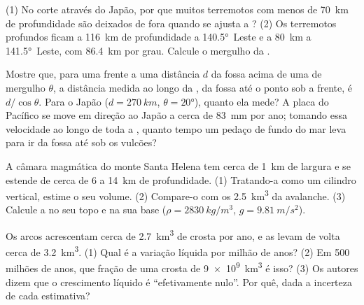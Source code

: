 \begin{exercise}[$\star\star$]\label{exo:g12:subduction-magmatism:11}
(1) No corte através do Japão, por que muitos terremotos com menos de
\qty{70}{km} de profundidade são deixados de fora quando se ajusta a ?
(2) Os terremotos profundos ficam a \qty{116}{km} de profundidade a
\ang{140.5}~Leste e a \qty{80}{km} a \ang{141.5}~Leste, com \qty{86.4}{km}
por grau. Calcule o mergulho da .
\end{exercise}

\begin{exercise}[$\star\star\star$]\label{exo:g12:subduction-magmatism:12}
Mostre que, para uma frente a uma distância $d$ da fossa acima de uma 
de mergulho $\theta$, a distância medida ao longo da , da fossa até o
ponto sob a frente, é $d/\cos\theta$. Para o Japão ($d = \qty{270}{km}$,
$\theta = \ang{20}$), quanto ela mede? A placa do Pacífico se move em
direção ao Japão a cerca de \qty{83}{mm} por ano; tomando essa velocidade
ao longo de toda a , quanto tempo um pedaço de fundo do mar leva para ir
da fossa até sob os vulcões?
\end{exercise}

\begin{exercise}[$\star\star\star$]\label{exo:g12:subduction-magmatism:13}
A câmara magmática do monte Santa Helena tem cerca de \qty{1}{km} de
largura e se estende de cerca de 6 a \qty{14}{km} de profundidade.
(1) Tratando-a como um cilindro vertical, estime o seu volume. (2) Compare-o
com os \qty{2.5}{km^3} da avalanche. (3) Calcule a  no
seu topo e na sua base ($\rho =
\qty{2830}{kg/m^3}$, $g = \qty{9.81}{m/s^2}$).
\end{exercise}

\begin{exercise}[$\star\star\star$]\label{exo:g12:subduction-magmatism:14}
Os arcos acrescentam cerca de \qty{2.7}{km^3} de crosta por ano, e as  levam de volta cerca de \qty{3.2}{km^3}. (1) Qual é a variação
líquida por milhão de anos? (2) Em 500 milhões de anos, que fração de uma
crosta de \qty{9e9}{km^3} é isso? (3) Os autores dizem que o crescimento
líquido é ``efetivamente nulo''. Por quê, dada a incerteza de cada
estimativa?
\end{exercise}

